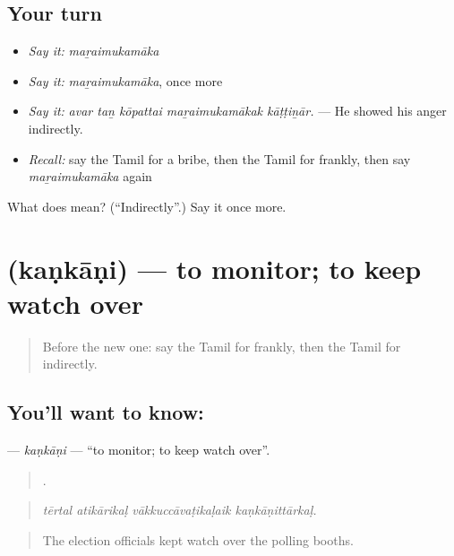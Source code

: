 \subsection*{Your turn}
\begin{itemize}
\raggedright
  \item \emph{Say it:} \emph{maṟaimukamāka}
  \item \emph{Say it:} \emph{maṟaimukamāka}, once more
  \item \emph{Say it:} \emph{avar taṉ kōpattai maṟaimukamākak kāṭṭiṉār.} — He showed his anger indirectly.
  \item \emph{Recall:} say the Tamil for a bribe, then the Tamil for frankly, then say \emph{maṟaimukamāka} again
\end{itemize}

\begin{tcolorbox}[breakable,colback=teal!4,colframe=teal!35!black,title={Before you move on}]
What does  mean? (\textquotedblleft{}Indirectly\textquotedblright{}.) Say it once more.
\end{tcolorbox}
\section[\texorpdfstring{\ta{கண்காணி} (kaṇkāṇi)}{கண்காணி (kaṇkāṇi)}]{ (kaṇkāṇi) — to monitor; to keep watch over}

\label{lesson:TA-C392-kankani}



\begin{quote}
Before the new one: say the Tamil for frankly, then the Tamil for indirectly.
\end{quote}

\subsection*{You'll want to know: }
\textbf{} — \emph{kaṇkāṇi} — \textquotedblleft{}to monitor; to keep watch over\textquotedblright{}.

\begin{quote}
   .
\end{quote}

\begin{quote}
\emph{tērtal atikārikaḷ vākkuccāvaṭikaḷaik kaṇkāṇittārkaḷ.}
\end{quote}

\begin{quote}
The election officials kept watch over the polling booths.
\end{quote}

